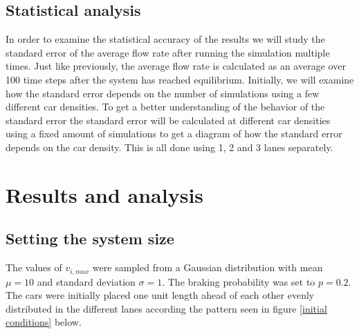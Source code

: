 \documentclass[a4paper,12pt]{article}
\begin{document}
\subsection*{Statistical analysis}
In order to examine the statistical accuracy of the results we will study the standard error of the average flow rate after running the simulation multiple times. 
Just like previously, the average flow rate is calculated as an average over 100 time steps after the system has reached equilibrium. Initially, we will examine how the standard error
depends on the number of simulations using a few different car densities. To get a better understanding of the behavior of the standard error the standard error will be calculated
at different car densities using a fixed amount of simulations to get a diagram of how the standard error depends on the car density. This is all done using 1, 2 and 3 lanes separately.

\section*{Results and analysis}
\subsection*{Setting the system size}
The values of $v_{i,max}$ were sampled from a Gaussian distribution with mean $\mu = 10$ and standard deviation $\sigma = 1$. The braking probability
was set to $p=0.2$. The cars were initially placed one unit length ahead of each other evenly distributed in the different lanes according the 
pattern seen in figure \ref*{initial conditions} below.
\end{document}
